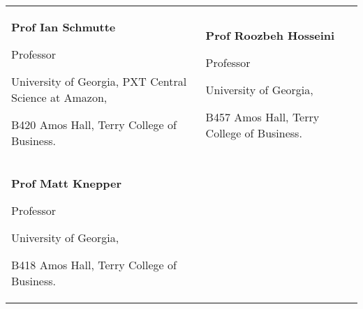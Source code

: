 

\begin{tabularx}{\textwidth}{@{}X X@{}}
\textbf{Prof Ian Schmutte}\par
Professor\par
University of Georgia, PXT Central Science at Amazon,\par 
B420 Amos Hall, Terry College of Business.\par 
\makefield{\faEnvelopeO}{\url{econasst@uga.edu}}
& 
\textbf{Prof Roozbeh Hosseini}\par
Professor\par
University of Georgia,\par 
B457 Amos Hall, Terry College of Business.\par 
\makefield{\faEnvelopeO}{\url{econasst@uga.edu}}
\\
\textbf{Prof Matt Knepper}\par
Professor\par
University of Georgia,\par 
B418 Amos Hall, Terry College of Business.\par 
\makefield{\faEnvelopeO}{\url{mknepper@uga.edu}}
\end{tabularx}
